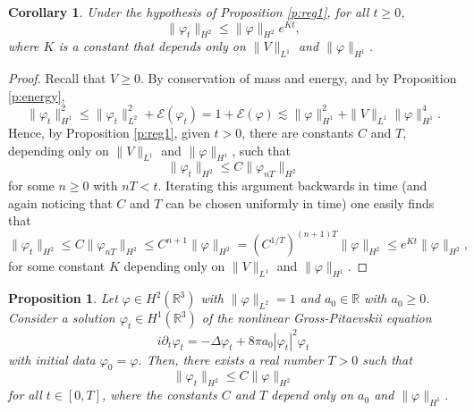 \documentclass[11pt,a4paper]{scrartcl} %
\newtheorem{cor}[thm]{Corollary}
\newtheorem{prp}[thm]{Proposition}
\newcommand{\R}{\mathds{R}}
\begin{document}
\begin{cor}
  \label{c:reg1}
  Under the hypothesis of Proposition \ref{p:reg1}, for all $t \ge 0$,
  \begin{displaymath}
    \| \varphi_t \|_{H^2} \le \| \varphi \|_{H^2} e^{Kt},
  \end{displaymath}
  where $K$ is a constant that depends only on $\| V \|_{L^1}$ and $\| \varphi
  \|_{H^1}$.
\end{cor}


\begin{proof}
  Recall that $V \ge 0$. By conservation of mass and energy, and by
  Proposition \ref{p:energy},
  \begin{displaymath}
    \| \varphi_t \|_{H^1}^2 \le \| \varphi_t \|_{L^2}^2 +
    \mathcal{E}(\varphi_t) = 1 + \mathcal{E}(\varphi) \apprle \| \varphi
    \|_{H^1}^2 + \| V \|_{L^1} \| \varphi \|_{H^1}^4.
  \end{displaymath}
  Hence, by Proposition \ref{p:reg1}, given $t > 0$, there are constants $C$
  and $T$, depending only on $\| V \|_{L^1}$ and $\| \varphi \|_{H^1}$, such
  that
  \begin{displaymath}
    \| \varphi_t \|_{H^2} \le C \| \varphi_{nT} \|_{H^2}
  \end{displaymath}
  for some $n \ge 0$ with $nT < t$. Iterating this argument backwards in time
  (and again noticing that $C$ and $T$ can be chosen uniformly in time) one
  easily finds that
  \begin{displaymath}
    \| \varphi_t \|_{H^2} \le C \| \varphi_{nT} \|_{H^2} \le C^{n+1} \|
    \varphi \|_{H^2} = (C^{1/T})^{(n+1)T}
    \| \varphi \|_{H^2} \le e^{Kt} \| \varphi \|_{H^2},
  \end{displaymath}
  for some constant $K$ depending only on $\| V \|_{L^1}$ and $\| \varphi
  \|_{H^1}$.
\end{proof}


\begin{prp}
  \label{p:reg2}
  Let $\varphi \in H^2(\R^3)$ with $\| \varphi \|_{L^2} = 1$ and $a_0 \in \R$
  with $a_0 \ge 0$. Consider a solution $\varphi_t \in H^1(\R^3)$ of the
  nonlinear Gross-Pitaevskii equation
  \begin{displaymath}
    i \partial_t \varphi_t = - \Delta \varphi_t + 8 \pi a_0 |\varphi_t|^2
    \varphi_t
  \end{displaymath}
  with initial data $\varphi_0 = \varphi$. Then, there exists a real number $T
  > 0$ such that
  \begin{displaymath}
    \| \varphi_t \|_{H^2} \le C \| \varphi \|_{H^2}
  \end{displaymath}
  for all $t \in [0,T]$, where the constants $C$ and $T$ depend only on $a_0$
  and $\| \varphi \|_{H^1}$.
\end{prp}
\end{document}
